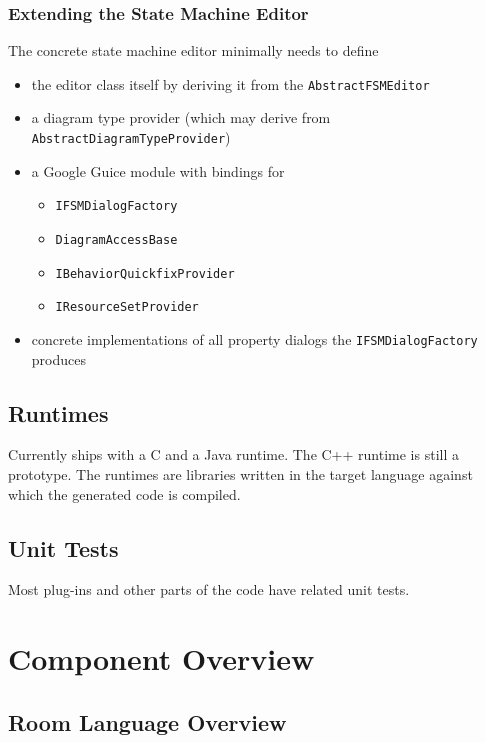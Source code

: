 \subsubsection{Extending the State Machine Editor}

The concrete state machine editor minimally needs to define
\begin{itemize}
\item the editor class itself by deriving it from the \texttt{AbstractFSMEditor}
\item a diagram type provider (which may derive from \texttt{AbstractDiagramTypeProvider})
\item a Google Guice module with bindings for
	\begin{itemize}
	\item \texttt{IFSMDialogFactory}
	\item \texttt{DiagramAccessBase}
	\item \texttt{IBehaviorQuickfixProvider}
	\item \texttt{IResourceSetProvider}
	\end{itemize}
\item concrete implementations of all property dialogs the \texttt{IFSMDialogFactory} produces
\end{itemize}


\subsection{Runtimes}

Currently \eTrice{} ships with a C and a Java runtime. The C++ runtime is still a prototype.
The runtimes are libraries written in the target 
language against which the generated code is compiled.

\subsection{Unit Tests}

Most plug-ins and other parts of the code have related unit tests.

\section{Component Overview}

\subsection{Room Language Overview}

